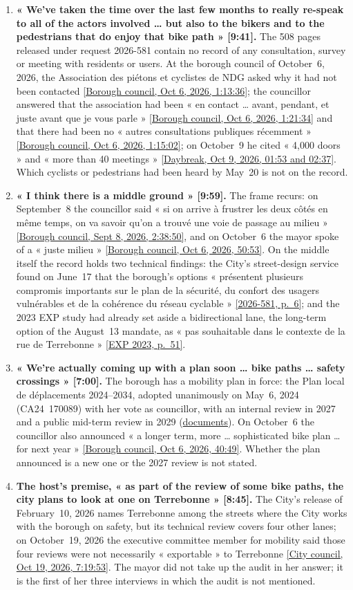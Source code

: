 \documentclass[10pt,letterpaper]{article}
\newcommand{\repourl}{https://github.com/OpenMobilityData/Terrebonne-open-sources}
\newcommand{\doc}[2]{\href{\repourl/blob/main/#1}{#2}}
\newcommand{\pagesurl}{https://openmobilitydata.github.io/Terrebonne-access-requests}
\newcommand{\cliptime}[1]{\textsf{\small[#1]}}
\newcommand{\octsix}[2]{\href{\repourl/blob/main/2026-10-06-borough-council/derived/#1}{\textsf{\small[Borough council, Oct 6, 2026, #2]}}}
\newcommand{\septeight}[1]{\href{\repourl/blob/main/2026-09-08-borough-council/}{\textsf{\small[Borough council, Sept 8, 2026, #1]}}}
\newcommand{\dbocttime}[1]{\href{\repourl/blob/main/2026-cbc-daybreak-interview/}{\textsf{\small[Daybreak, Oct 9, 2026, #1]}}}
\newcommand{\pgl}[2]{\href{\pagesurl/2026-581/raw/01_emails_mandate_counts.pdf\#page=#1}{\textsf{\small[2026-581, p.~#2]}}}
\newcommand{\pg}[1]{\pgl{#1}{#1}}
\newcommand{\exppg}[1]{\href{\repourl/blob/main/2023-exp-mobility-study/raw/EXP_Etude_de_mobilite_rue_de_Terrebonne_2023.pdf}{\textsf{\small[EXP 2023, p.~#1]}}}
\newcommand{\tr}[1]{\href{\repourl/blob/main/2026-10-19-city-council/2026-10-19_03.md}{\textsf{\small[City council, Oct 19, 2026, #1]}}}
\begin{document}
\begin{enumerate}[nosep,itemsep=0.3em,leftmargin=1.4em]
\item \textbf{« We've taken the time over the last few months to really re-speak to all of the actors involved … but also to the bikers and to the pedestrians that do enjoy that bike path » \cliptime{9:41}.} The 508 pages released under request 2026-581 contain no record of any consultation, survey or meeting with residents or users. At the borough council of October~6, 2026, the Association des piétons et cyclistes de NDG asked why it had not been contacted \octsix{2026-10-06_02.md}{1:13:36}; the councillor answered that the association had been « en contact … avant, pendant, et juste avant que je vous parle » \octsix{2026-10-06_02.md}{1:21:34} and that there had been no « autres consultations publiques récemment » \octsix{2026-10-06_02.md}{1:15:02}; on October~9 he cited « 4,000 doors » and « more than 40 meetings » \dbocttime{01:53 and 02:37}. Which cyclists or pedestrians had been heard by May~20 is not on the record.
\item \textbf{« I think there is a middle ground » \cliptime{9:59}.} The frame recurs: on September~8 the councillor said « si on arrive à frustrer les deux côtés en même temps, on va savoir qu'on a trouvé une voie de passage au milieu » \septeight{2:38:50}, and on October~6 the mayor spoke of a « juste milieu » \octsix{2026-10-06_07.md}{50:53}. On the middle itself the record holds two technical findings: the City's street-design service found on June~17 that the borough's options « présentent plusieurs compromis importants sur le plan de la sécurité, du confort des usagers vulnérables et de la cohérence du réseau cyclable » \pg{6}; and the 2023 EXP study had already set aside a bidirectional lane, the long-term option of the August~13 mandate, as « pas souhaitable dans le contexte de la rue de Terrebonne » \exppg{51}.
\item \textbf{« We're actually coming up with a plan soon … bike paths … safety crossings » \cliptime{7:00}.} The borough has a mobility plan in force: the Plan local de déplacements 2024--2034, adopted unanimously on May~6, 2024 (CA24~170089) with her vote as councillor, with an internal review in 2027 and a public mid-term review in 2029 (\doc{2024-cdn-ndg-pld/}{documents}). On October~6 the councillor also announced « a longer term, more … sophisticated bike plan … for next year » \octsix{2026-10-06_01.md}{40:49}. Whether the plan announced is a new one or the 2027 review is not stated.
\item \textbf{The host's premise, « as part of the review of some bike paths, the city plans to look at one on Terrebonne » \cliptime{8:45}.} The City's release of February~10, 2026 names Terrebonne among the streets where the City works with the borough on safety, but its technical review covers four other lanes; on October~19, 2026 the executive committee member for mobility said those four reviews were not necessarily « exportable » to Terrebonne \tr{7:19:53}. The mayor did not take up the audit in her answer; it is the first of her three interviews in which the audit is not mentioned.
\end{enumerate}
\end{document}
